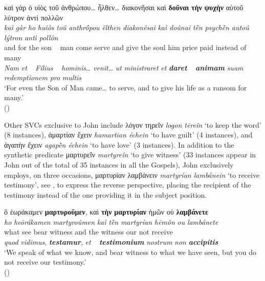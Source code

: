 \documentclass[output=paper,colorlinks,citecolor=brown]{langscibook}
\begin{document}
\ex\label{ex:bj:10b}

\gllll καὶ γὰρ ὁ υἱὸς τοῦ ἀνθρώπου\ldots{} ἦλθεν\ldots{} διακονῆσαι καὶ \textbf{δοῦναι} \textbf{τὴν} \textbf{ψυχὴν} αὐτοῦ λύτρον ἀντὶ πολλῶν\\
 \textit{kaì} \textit{gàr} \textit{ho} \textit{huiòs} \textit{toû} \textit{anthrṓpou} \textit{êlthen} \textit{diakonêsai} \textit{kaì} \textit{doûnai} \textit{tḕn} \textit{psychḕn} \textit{autoû} \textit{lýtron} \textit{antì} \textit{pollôn}\\
and for the son ~ man come serve and give the soul him {price paid} {instead of} many\\
\emph{Nam} \emph{et} ~ \emph{Filius} ~ \emph{hominis}\ldots{} \emph{venit}\ldots{} {\emph{ut}
  \emph{ministraret}} \emph{et} \textbf{\itshape daret} ~ \textbf{\itshape animam} \emph{suam} \emph{redemptionem} \emph{pro} \emph{multis}\\
\glt `For even the Son of Man came\ldots{} to serve, and to give his life as a ransom for many.' \\
\hspace*{\fill}()

\z

\z

Other SVCs exclusive to John include λόγον τηρεῖν \emph{logon tēreîn} `to keep the word'
(8 instances), ἁμαρτίαν ἔχειν \emph{hamartian échein} `to have guilt' (4 instances), and
ἀγαπὴν ἔχειν \emph{agapḕn échein} `to have love' (3 instances). In addition to the
synthetic predicate μαρτυρεῖν \emph{martyreîn} `to give witness' (33 instances appear in John out of the total of 35 instances
in all the Gospels), John exclusively employs, on three occasions, μαρτυρίαν λαμβάνειν
\emph{martyrían lambánein} `to receive testimony', see , to express the reverse
perspective, placing the recipient of the testimony instead of the
one providing it in the subject position.

\ea\label{ex:bj:11}

\gllll ὃ ἑωράκαμεν \textbf{μαρτυροῦμεν}, καὶ \textbf{τὴν} \textbf{μαρτυρίαν} ἡμῶν οὐ \textbf{λαμβάνετε}\\
 \textit{ho} \textit{heōrákamen} \textit{martyroûmen} \textit{kaì} \textit{tḕn} \textit{martyrían} \textit{hēmôn} \textit{ou} \textit{lambánete}\\
what see {bear witness} and the witness our not receive\\
\emph{quod} \emph{vidimus}, \textbf{\itshape testamur}, \emph{et} ~ \textbf{\itshape
  testimonium} \emph{nostrum} \emph{non} \textbf{\itshape accipitis}\\
\glt `We speak of what we know, and bear witness to what we have seen, but you do not receive our testimony.' \\
\hspace*{\fill}()
\end{document}
